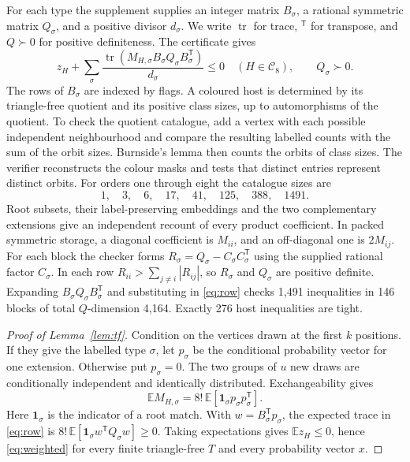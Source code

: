 \documentclass[11pt,a4paper]{article}
\newcommand{\E}{\mathbb E}
\newcommand{\one}{\mathbf 1}
\newcommand{\trans}{\mathsf T}
\DeclareMathOperator{\tr}{tr}
\begin{document}
For each type the supplement supplies an integer matrix \(B_\sigma\), a rational symmetric matrix \(Q_\sigma\), and a positive divisor \(d_\sigma\). We write \(\tr\) for trace, \({}^{\trans}\) for transpose, and \(Q\succ0\) for positive definiteness. The certificate gives
\begin{equation}\label{eq:row}
 z_H+\sum_\sigma \frac{\tr(M_{H,\sigma}B_\sigma Q_\sigma B_\sigma^{\trans})}{d_\sigma}\le0
 \quad(H\in\mathcal C_8),\qquad Q_\sigma\succ0 .
\end{equation}
The rows of \(B_\sigma\) are indexed by flags. A coloured host is determined by its triangle-free quotient and its positive class sizes, up to automorphisms of the quotient. To check the quotient catalogue, add a vertex with each possible independent neighbourhood and compare the resulting labelled counts with the sum of the orbit sizes. Burnside's lemma then counts the orbits of class sizes. The verifier reconstructs the colour masks and tests that distinct entries represent distinct orbits. For orders one through eight the catalogue sizes are
\[
   1,\quad 3,\quad 6,\quad 17,\quad 41,\quad 125,\quad 388,\quad 1491 .
\]
Root subsets, their label-preserving embeddings and the two complementary extensions give an independent recount of every product coefficient. In packed symmetric storage, a diagonal coefficient is \(M_{ii}\), and an off-diagonal one is \(2M_{ij}\). For each block the checker forms \(R_\sigma=Q_\sigma-C_\sigma C_\sigma^{\trans}\) using the supplied rational factor \(C_\sigma\). In each row \(R_{ii}>\sum_{j\ne i}|R_{ij}|\), so \(R_\sigma\) and \(Q_\sigma\) are positive definite. Expanding \(B_\sigma Q_\sigma B_\sigma^{\trans}\) and substituting in \eqref{eq:row} checks 1,491 inequalities in 146 blocks of total \(Q\)-dimension 4,164. Exactly 276 host inequalities are tight.

\begin{proof}[Proof of Lemma~\ref{lem:tf}]
Condition on the vertices drawn at the first \(k\) positions. If they give the labelled type \(\sigma\), let \(p_\sigma\) be the conditional probability vector for one extension. Otherwise put \(p_\sigma=0\). The two groups of \(u\) new draws are conditionally independent and identically distributed. Exchangeability gives
\[
 \E M_{H,\sigma}=8!\,\E[\one_\sigma p_\sigma p_\sigma^{\trans}].
\]
Here \(\one_\sigma\) is the indicator of a root match. With \(w=B_\sigma^{\trans}p_\sigma\), the expected trace in \eqref{eq:row} is \(8!\,\E[\one_\sigma w^{\trans}Q_\sigma w]\ge0\). Taking expectations gives \(\E z_H\le0\), hence \eqref{eq:weighted} for every finite triangle-free \(T\) and every probability vector \(x\).
\end{proof}
\end{document}
